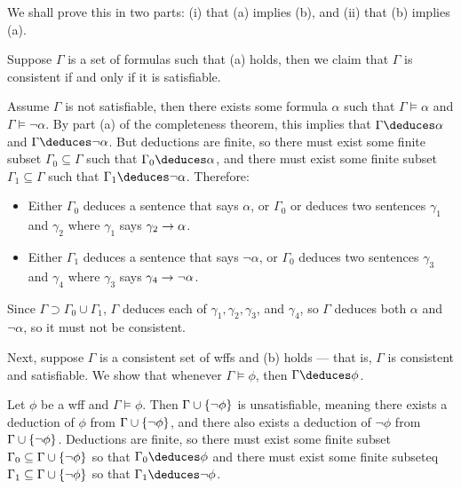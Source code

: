 \begin{Answer}
  We shall prove this in two parts: (i) that (a) implies (b),
  and (ii) that (b) implies (a).

  \bigskip
  Suppose $\Gamma$ is a set of formulas such that (a) holds,
  then we claim that $\Gamma$ is consistent if and only if it is satisfiable.

  \step
  Assume $\Gamma$ is not satisfiable, then there exists some formula
  $\alpha$ such that $\Gamma \models \alpha$ and $\Gamma \models \lnot \alpha$.
  By part (a) of the completeness theorem, this implies that
  $\Gamma \deduces \alpha$ and $\Gamma \deduces \lnot \alpha$.
  But deductions are finite, so there must exist some finite subset
  $\Gamma_0 \subseteq \Gamma$ such that $\Gamma_0 \deduces \alpha$,
  and there must exist some finite subset $\Gamma_1 \subseteq \Gamma$
  such that $\Gamma_1 \deduces \lnot \alpha$.
  Therefore:
  \begin{itemize}
    \item Either $\Gamma_0$ deduces a sentence that says $\alpha$,
      or $\Gamma_0$ or deduces two sentences $\gamma_1$ and $\gamma_2$
      where $\gamma_1$ says $\gamma_2 \rightarrow \alpha$.
    \item Either $\Gamma_1$ deduces a sentence that says $\lnot \alpha$,
      or $\Gamma_0$ deduces two sentences $\gamma_3$ and $\gamma_4$
      where $\gamma_3$ says $\gamma_4 \rightarrow \lnot \alpha$.
  \end{itemize}
    Since $\Gamma \supset \Gamma_0 \cup \Gamma_1$, $\Gamma$
      deduces each of $\gamma_1, \gamma_2, \gamma_3$, and $\gamma_4$, so
      $\Gamma$ deduces both $\alpha$ and $\lnot \alpha$, so it must not
      be consistent.

  \step

  \bigskip
  Next, suppose $\Gamma$ is a consistent set of wffs and (b) holds ---
  that is, $\Gamma$ is consistent and satisfiable.
  We show that whenever $\Gamma \models \phi$, then $\Gamma \deduces \phi$.

  \step
  Let $\phi$ be a wff and $\Gamma \models \phi$.
  Then $\Gamma \cup \left\{\lnot \phi\right\}$ is unsatisfiable,
  meaning there exists a deduction of $\phi$ from
  $\Gamma \cup \left\{\lnot \phi\right\}$,
  and there also exists a deduction of $\lnot \phi$ from
  $\Gamma \cup \left\{\lnot \phi\right\}$.
  Deductions are finite, so there must exist some finite subset
  $\Gamma_0 \subseteq \Gamma \cup \left\{ \lnot \phi \right\}$ so that
  $\Gamma_0 \deduces \phi$ and there must exist some finite subseteq
  $\Gamma_1 \subseteq \Gamma \cup \left\{ \lnot \phi \right\}$ so that
  $\Gamma_1 \deduces \lnot \phi$.
  

\end{Answer}
